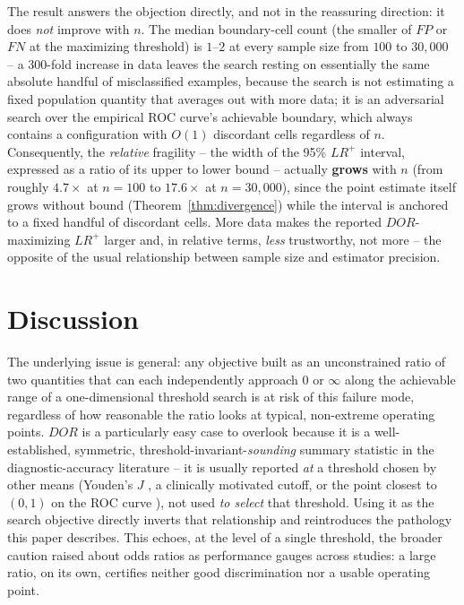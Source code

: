 \documentclass[11pt]{article}
\begin{document}
The result answers the objection directly, and not in the reassuring
direction: it does \emph{not} improve with $n$. The median boundary-cell
count (the smaller of $FP$ or $FN$ at the maximizing threshold) is $1$--$2$
at every sample size from $100$ to $30{,}000$ -- a $300$-fold increase in
data leaves the search resting on essentially the same absolute handful of
misclassified examples, because the search is not estimating a fixed
population quantity that averages out with more data; it is an adversarial
search over the empirical ROC curve's achievable boundary, which always
contains a configuration with $O(1)$ discordant cells regardless of $n$.
Consequently, the \emph{relative} fragility -- the width of the 95\% $LR^+$
interval, expressed as a ratio of its upper to lower bound -- actually
\textbf{grows} with $n$ (from roughly $4.7\times$ at $n=100$ to
$17.6\times$ at $n=30{,}000$), since the point estimate itself grows
without bound (Theorem~\ref{thm:divergence}) while the interval is anchored
to a fixed handful of discordant cells. More data makes the reported
$DOR$-maximizing $LR^+$ larger and, in relative terms, \emph{less}
trustworthy, not more -- the opposite of the usual relationship between
sample size and estimator precision.

\section{Discussion}
\label{sec:discussion}

The underlying issue is general: any objective built as an unconstrained
ratio of two quantities that can each independently approach $0$ or
$\infty$ along the achievable range of a one-dimensional threshold search
is at risk of this failure mode, regardless of how reasonable the ratio
looks at typical, non-extreme operating points. $DOR$ is a particularly
easy case to overlook because it is a well-established, symmetric,
threshold-invariant-\emph{sounding} summary statistic in the
diagnostic-accuracy literature \citep{glas2003,simundic2009} -- it is
usually reported \emph{at} a threshold chosen by other means (Youden's $J$
\citep{youden1950}, a clinically motivated cutoff, or the point closest to
$(0,1)$ on the ROC curve \citep{perkins2006}), not used \emph{to select}
that threshold. Using it as the search objective directly inverts that
relationship and reintroduces the pathology this paper describes. This
echoes, at the level of a single threshold, the broader caution
\citet{pepe2004} raised about odds ratios as performance gauges across
studies: a large ratio, on its own, certifies neither good discrimination
nor a usable operating point.
\end{document}

